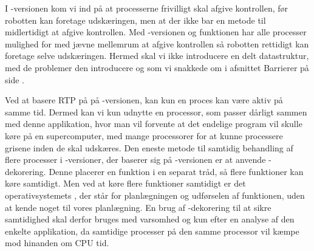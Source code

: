 I -versionen kom vi ind på at processerne frivilligt skal afgive kontrollen, før robotten kan foretage udskæringen, men at der ikke bar en metode til midlertidigt at afgive kontrollen. Med -versionen og funktionen  har alle processer mulighed for med jævne mellemrum at afgive kontrollen så robotten rettidigt kan foretage selve udskæringen. Hermed skal vi ikke introducere en delt datastruktur, med de problemer den introducere og som vi snakkede om i afsnittet Barrierer på side \pageref{sec:barrierer}.
  
Ved at basere RTP på  på -versionen, kan kun en proces  kan være aktiv på samme tid. Dermed kan vi kun udnytte en processor, som  passer dårligt sammen med denne applikation, hvor man vil forvente at det endelige program vil skulle køre på en supercomputer, med mange processorer for at kunne processere grisene inden de skal udskæres.  Den eneste metode til samtidig behandling af flere processer i \pycsp-versioner, der baserer sig på -versionen er at anvende -dekorering. Denne placerer en funktion i en separat tråd, så flere funktioner kan køre samtidigt. Men ved at køre flere funktioner samtidigt er det operativsystemets \sched, der står for planlægningen og  udførselen af funktionen, uden at kende noget til vores planlægning. En brug af -dekorering til at sikre samtidighed skal derfor bruges med varsomhed og kun efter en analyse af den enkelte applikation, da samtidige processer på den samme processor vil kæmpe mod hinanden om CPU tid.
 
